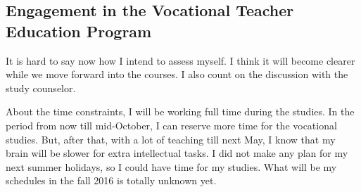   
\subsection{Engagement in the Vocational Teacher Education Program}

It is hard to say now how I intend to assess myself. 
I think it will become clearer while we move forward into the courses. 
I also count on the discussion with the study counselor.

About the time constraints, I will be working full time during the studies. 
In the period from now till mid-October, I can reserve more time for the vocational studies. 
But, after that, with a lot of teaching till next May, I know that my brain will be slower for extra intellectual tasks. 
I did not make any plan for my next summer holidays, so I could have time for my studies. 
What will be my schedules in the fall 2016 is totally unknown yet.




